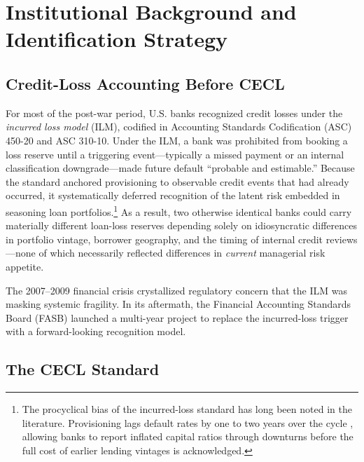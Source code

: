 
\section{Institutional Background and Identification Strategy}
\label{sec:background}

\subsection{Credit-Loss Accounting Before CECL}
\label{sec:background:ilm}

For most of the post-war period, U.S. banks recognized credit losses under the
\textit{incurred loss model} (ILM), codified in Accounting Standards Codification
(ASC) 450-20 and ASC 310-10. Under the ILM, a bank was prohibited from booking a
loss reserve until a triggering event—typically a missed payment or an internal
classification downgrade—made future default ``probable and estimable.'' Because
the standard anchored provisioning to observable credit events that had already
occurred, it systematically deferred recognition of the latent risk embedded in
seasoning loan portfolios.\footnote{The procyclical bias of the incurred-loss
standard has long been noted in the literature. Provisioning lags default rates
by one to two years over the cycle \citep[e.g.,][]{BeattyLiao2011}, allowing
banks to report inflated capital ratios through downturns before the full cost of
earlier lending vintages is acknowledged.} As a result, two otherwise identical
banks could carry materially different loan-loss reserves depending solely on
idiosyncratic differences in portfolio vintage, borrower geography, and the
timing of internal credit reviews—none of which necessarily reflected differences
in \textit{current} managerial risk appetite.

The 2007–2009 financial crisis crystallized regulatory concern that the ILM was
masking systemic fragility. In its aftermath, the Financial Accounting Standards
Board (FASB) launched a multi-year project to replace the incurred-loss trigger
with a forward-looking recognition model.

\subsection{The CECL Standard}
\label{sec:background:cecl}

